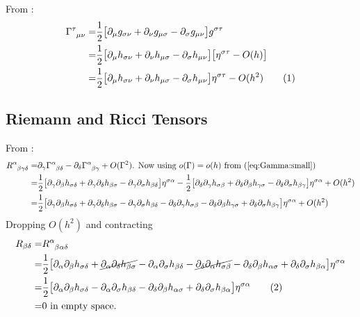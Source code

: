 \documentclass[]{article}
\newcommand\numberthis{\addtocounter{equation}{1}\tag{\theequation}}
\begin{document}
From \cite[Lecture 10]{susskind2012general}:
\begin{align*}
	\Gamma\indices{^{\tau}_{\mu\nu}} =&\frac{1}{2} \big[ \partial_\mu g_{\sigma\nu} + \partial_\nu g_{\mu\sigma} - \partial_\sigma g_{\mu\nu}\big] g^{\sigma\tau}\\
	=& \frac{1}{2} \big[ \partial_\mu h_{\sigma\nu} + \partial_\nu h_{\mu\sigma} - \partial_\sigma h_{\mu\nu}\big] \big[\eta^{\sigma\tau }- O(h)\big]\\
	=& \frac{1}{2} \big[ \partial_\mu h_{\sigma\nu} + \partial_\nu h_{\mu\sigma} - \partial_\sigma h_{\mu\nu}\big] \eta^{\sigma\tau }- O(h^2) \numberthis \label{eq:Gamma:small}
\end{align*}

\subsection{Riemann and Ricci Tensors}
From \cite[Lecture 3]{susskind2012general}:
\begin{align*}
	R\indices{^\alpha_{\beta\gamma\delta}} =& \partial_\gamma\Gamma\indices{^\alpha_{\beta\delta}}-\partial_\delta\Gamma\indices{^\alpha_{\beta\gamma}} + O(\Gamma^2) \text{. Now using $o(\Gamma)=o(h)$ from (\ref{eq:Gamma:small})} \\
	=& \frac{1}{2} \big[ \partial_\gamma\partial_\beta h_{\sigma\delta} + \partial_\gamma\partial_\delta h_{\beta\sigma} - \partial_\gamma\partial_\sigma h_{\beta\delta}\big] \eta^{\sigma\alpha }- \frac{1}{2} \big[ \partial_\delta\partial_\gamma h_{\sigma\beta} + \partial_\delta\partial_\beta h_{\gamma\sigma} - \partial_\delta\partial_\sigma h_{\beta\gamma}\big] \eta^{\sigma\alpha }+ O(h^2)\\
	=& \frac{1}{2} \big[ \partial_\gamma\partial_\beta h_{\sigma\delta} + \partial_\gamma\partial_\delta h_{\beta\sigma} - \partial_\gamma\partial_\sigma h_{\beta\delta} - \partial_\delta\partial_\gamma h_{\sigma\beta} - \partial_\delta\partial_\beta h_{\gamma\sigma} + \partial_\delta\partial_\sigma h_{\beta\gamma}\big] \eta^{\sigma\alpha }+ O(h^2)
\end{align*}
Dropping $O(h^2)$ and contracting
\begin{align*}
	R_{\beta\delta} =& 	R\indices{^\alpha_{\beta\alpha\delta}}\\
	=& \frac{1}{2} \big[ \partial_\alpha\partial_\beta h_{\sigma\delta} + \cancel{\partial_\alpha\partial_\delta h_{\beta\sigma}} - \partial_\alpha\partial_\sigma h_{\beta\delta} - \cancel{\partial_\delta\partial_\alpha h_{\sigma\beta}} - \partial_\delta\partial_\beta h_{\alpha\sigma} + \partial_\delta\partial_\sigma h_{\beta\alpha}\big] \eta^{\sigma\alpha }
	\\
	=& \frac{1}{2} \big[ \partial_\alpha\partial_\beta h_{\sigma\delta} - \partial_\alpha\partial_\sigma h_{\beta\delta} -  \partial_\delta\partial_\beta h_{\alpha\sigma} + \partial_\delta\partial_\sigma h_{\beta\alpha}\big] \eta^{\sigma\alpha } \numberthis \label{eq:linearized}\\
	=& 0 \text{ in empty space}.
\end{align*}
\end{document}
